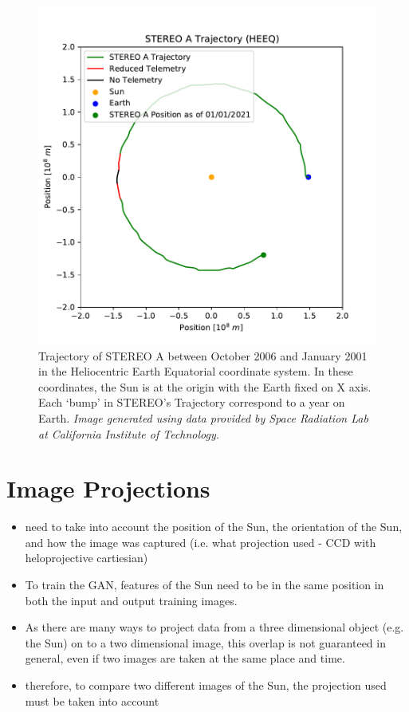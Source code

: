 \documentclass[11pt,a4paper,onecolumn]{report}
\begin{document}
\begin{figure}[ht]
  \centering
  \includegraphics[width = 0.7\linewidth]{STEREO_pos.pdf}
  \caption[STEREO A Trajectory]{Trajectory of STEREO A between October 2006 and January 2001 in the
  Heliocentric Earth Equatorial coordinate system. In these coordinates, the Sun
  is at the origin with the Earth fixed on X axis. Each `bump' in STEREO's
  Trajectory correspond to a year on Earth. \textit{Image generated using
  data provided by Space Radiation Lab at California Institute of Technology.}}
  \label{fig:stereo_pos}
\end{figure}


\section{Image Projections}

\begin{itemize}
  \item need to take into account the position of the Sun, the orientation of
  the Sun, and how the image was captured (i.e. what projection used - CCD with
  heloprojective cartiesian)
  \item To train the GAN, features of the Sun need to be in the same position in both
  the input and output training images.
  \item As there are many ways to project data from a three dimensional object
  (e.g. the Sun) on to a two dimensional image, this overlap is not guaranteed
  in general, even if two images are taken at the same place and time.
  \item therefore, to compare two different images of the Sun, the projection used
must be taken into account
\end{itemize}
\end{document}
